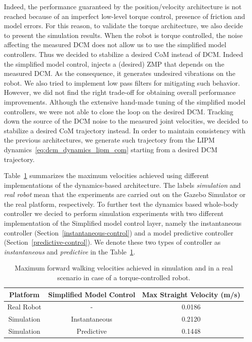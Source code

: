 Indeed, the performance guaranteed by the position/velocity architecture is not reached because of an imperfect low-level torque control, presence of friction and model errors.
For this reason, to validate the torque architecture, we also decide to present the simulation results.
When the robot is torque controlled, the noise affecting the measured DCM does not allow us to use the simplified model controllers. Thus we decided to stabilize a desired CoM instead of DCM.
Indeed the simplified model control, injects a (desired) ZMP that depends on the measured DCM. As the consequence, it generates undesired vibrations on the robot. We also tried to implement low pass filters for mitigating such behavior. However, we did not find the right trade-off for obtaining overall performance improvements.
Although the extensive hand-made tuning of the simplified model controllers, we were not able to close the loop on the desired DCM. Tracking down the source of the DCM noise to the measured joint velocities, we decided to stabilize a desired CoM trajectory instead. In order to maintain consistency with the previous architectures, we generate such trajectory from the LIPM dynamics~\eqref{eq:dcm_dynamics_lipm_com} starting from a desired DCM trajectory.
\par
Table~\ref{tab:max_velocity_trq} summarizes the maximum velocities achieved using different implementations of the dynamics-based architecture. The labels \emph{simulation} and \emph{real robot} mean that the experiments are carried out on the Gazebo Simulator \citep{Koenig04} or the real platform, respectively. To further test the dynamics based whole-body controller we decied to perform simulation experiments with two different implementation of the Simplified model control layer, namely the instantaneous controller (Section~\ref{instantaneous-control}) and a model predictive controller (Section~\ref{predictive-control}). We denote these two types of controller as \emph{instantaneous} and \emph{predictive} in the Table~\ref{tab:max_velocity_trq}.

\begin{table}[b]
\centering
\caption{Maximum forward walking velocities achieved in simulation and in a real scenario in case of a torque-controlled robot. \label{tab:max_velocity_trq}}
{\begin{tabular}{@{}cc|c@{}}
Platform & Simplified Model Control & Max Straight Velocity (m/s) \\
\hline
Real Robot & -  &  0.0186\\
Simulation & Instantaneous  & 0.2120\\
Simulation & Predictive  &  0.1448\\
\end{tabular}}
\end{table}



